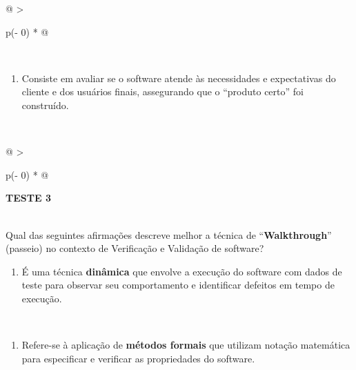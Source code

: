 \documentclass[
]{book}
\providecommand{\tightlist}{%
  \setlength{\itemsep}{0pt}\setlength{\parskip}{0pt}}
\begin{document}
\begin{longtable}[]{@{}
  >{\raggedright\arraybackslash}p{(\columnwidth - 0\tabcolsep) * }@{}}
\begin{minipage}[t]{\linewidth}
\begin{enumerate}
\end{enumerate}
\end{minipage} \\
\begin{minipage}[t]{\linewidth}\raggedright
\begin{enumerate}
\def\labelenumi{\Alph{enumi})}
\setcounter{enumi}{4}
\tightlist
\item
  Consiste em avaliar se o software atende às necessidades e expectativas do cliente e dos usuários finais, assegurando que o ``produto certo'' foi construído.
\end{enumerate}
\end{minipage} \\
\end{longtable}

\begin{longtable}[]{@{}
  >{\raggedright\arraybackslash}p{(\columnwidth - 0\tabcolsep) * }@{}}
\toprule\noalign{}
\begin{minipage}[b]{\linewidth}\raggedright
\textbf{TESTE 3}
\end{minipage} \\
\midrule\noalign{}
\endhead
\bottomrule\noalign{}
\endlastfoot
Qual das seguintes afirmações descreve melhor a técnica de ``\textbf{Walkthrough}'' (passeio) no contexto de Verificação e Validação de software? \\
\begin{minipage}[t]{\linewidth}\raggedright
\begin{enumerate}
\def\labelenumi{\Alph{enumi})}
\tightlist
\item
  É uma técnica \textbf{dinâmica} que envolve a execução do software com dados de teste para observar seu comportamento e identificar defeitos em tempo de execução.
\end{enumerate}
\end{minipage} \\
\begin{minipage}[t]{\linewidth}\raggedright
\begin{enumerate}
\def\labelenumi{\Alph{enumi})}
\setcounter{enumi}{1}
\tightlist
\item
  Refere-se à aplicação de \textbf{métodos formais} que utilizam notação matemática para especificar e verificar as propriedades do software.
\end{enumerate}
\end{minipage} \\
\begin{minipage}[t]{\linewidth}\raggedright

\end{minipage}
\end{longtable}
\end{document}
